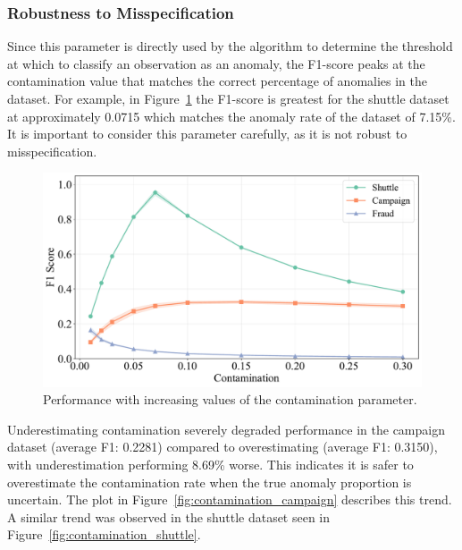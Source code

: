\documentclass[10pt, conference]{IEEEtran}
\begin{document}
\subsubsection{Robustness to Misspecification}
Since this parameter is directly used by the algorithm to determine the threshold at which to classify an observation as an anomaly, the F1-score peaks at the contamination value that matches the correct percentage of anomalies in the dataset. For example, in Figure~\ref{fig:contamination_all} the F1-score is greatest for the shuttle dataset at approximately 0.0715 which matches the anomaly rate of the dataset of 7.15\%. It is important to consider this parameter carefully, as it is not robust to misspecification.
\begin{figure}[H]
	\centering
	\includegraphics[width=0.95\linewidth]{../results/multi_dataset/contamination_f1.pdf}
	\caption{Performance with increasing values of the contamination parameter.}
	\label{fig:contamination_all}
\end{figure}




Underestimating contamination severely degraded performance in the campaign dataset (average F1: 0.2281) compared to overestimating (average F1: 0.3150), with underestimation performing 8.69\% worse. This indicates it is safer to overestimate the contamination rate when the true anomaly proportion is uncertain. The plot in Figure~\ref{fig:contamination_campaign} describes this trend. A similar trend was observed in the shuttle dataset seen in Figure~\ref{fig:contamination_shuttle}.
\end{document}
